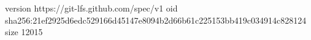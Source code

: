 version https://git-lfs.github.com/spec/v1
oid sha256:21ef2925d6edc529166d45147e8094b2d66b61c225153bb419c034914c828124
size 12015

